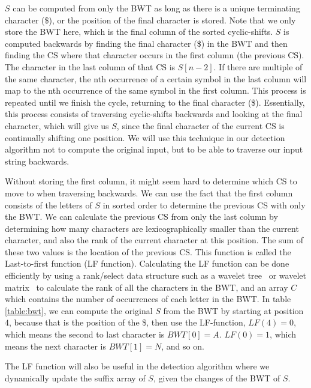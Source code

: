 $S$ can be computed from only the BWT as long as there is a unique terminating character
(\$), or the position of the final character is stored. Note that we only store the BWT
here, which is the final column of the sorted cyclic-shifts. $S$ is computed backwards by
finding the final character (\$) in the BWT and then finding the CS where that character
occurs in the first column (the previous CS). The character in the last column of that CS
is $S[n - 2]$. If there are multiple of the same character, the nth occurrence of a
certain symbol in the last column will map to the nth occurrence of the same symbol in the
first column. This process is repeated until we finish the cycle, returning to the final
character (\$). Essentially, this process consists of traversing cyclic-shifts backwards
and looking at the final character, which will give us $S$, since the final character of
the current CS is continually shifting one position. We will use this technique in our
detection algorithm not to compute the original input, but to be able to traverse our
input string backwards.

Without storing the first column, it might seem hard to determine which CS to move to when
traversing backwards. We can use the fact that the first column consists of the letters of
$S$ in sorted order to determine the previous CS with only the BWT. We can calculate the
previous CS from only the last column by determining how many characters are
lexicographically smaller than the current character, and also the rank of the current
character at this position. The sum of these two values is the location of the previous
CS. This function is called the Last-to-first function (LF function). Calculating the LF
function can be done efficiently by using a rank/select data structure such as a wavelet
tree~\cite{WaveletTree} or wavelet matrix~\cite{WaveletMatrix} to calculate the rank of
all the characters in the BWT, and an array $C$ which contains the number of occurrences
of each letter in the BWT. In table \ref{table:bwt}, we can compute the original $S$ from
the BWT by starting at position $4$, because that is the position of the \$, then use the
LF-function, $LF(4) = 0$, which means the second to last character is $BWT[0] = A$. $LF(0)
= 1$, which means the next character is $BWT[1] = N$, and so on.

The LF function will also be useful in the detection algorithm where we dynamically update
the suffix array of $S$, given the changes of the BWT of $S$.
